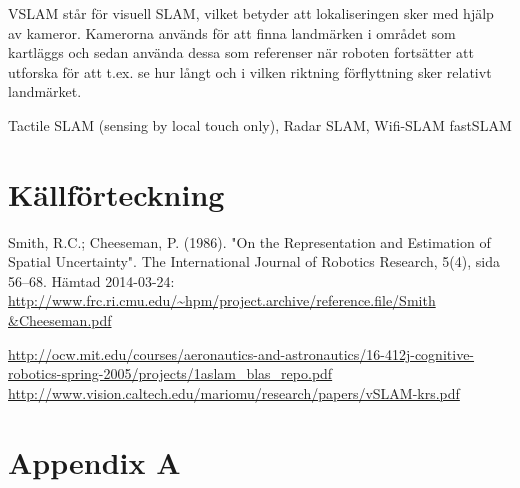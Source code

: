 \documentclass[a4paper,12pt,fleqn]{article} \usepackage{fixltx2e}
\begin{document}
VSLAM står för visuell SLAM, vilket betyder att lokaliseringen sker med hjälp av kameror. Kamerorna används för att finna landmärken i området som kartläggs och sedan använda dessa som referenser när roboten fortsätter att utforska för att t.ex. se hur långt och i vilken riktning förflyttning sker relativt landmärket.

 
Tactile SLAM (sensing by local touch only), Radar
SLAM, 
Wifi-SLAM 
fastSLAM

\newpage \section{Källförteckning} Smith, R.C.; Cheeseman, P. (1986).
"On the Representation and Estimation of Spatial Uncertainty". The
International Journal of Robotics Research, 5(4), sida 56–68. Hämtad
2014-03-24:
\url{http://www.frc.ri.cmu.edu/~hpm/project.archive/reference.file/Smith
&Cheeseman.pdf}

\url{http://ocw.mit.edu/courses/aeronautics-and-astronautics/16-412j-cognitive-robotics-spring-2005/projects/1aslam_blas_repo.pdf}
\url{http://www.vision.caltech.edu/mariomu/research/papers/vSLAM-krs.pdf}

% 
\newpage \appendix \pagestyle{empty}
 \section{Appendix A}
\end{document}
